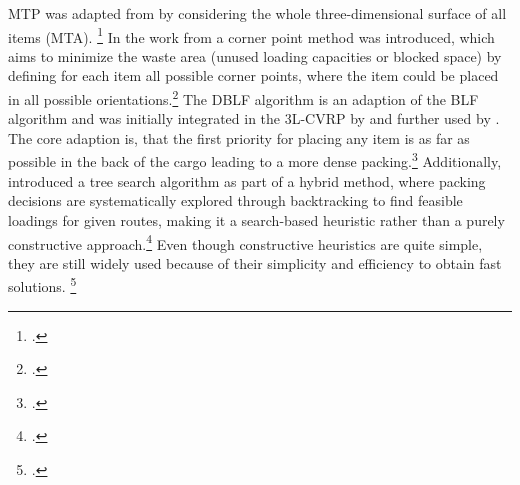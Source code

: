\gls{MTP} was adapted from \cite{tarantilis_hybrid_2009} by considering the whole three-dimensional
surface of all items (\gls{MTA}). \footcite[cf.][pp. 258-260]{tarantilis_hybrid_2009}
In the work from \cite{tao_effective_2015} a corner point method
was introduced, which aims to minimize the waste area (unused loading capacities or blocked space) by
defining for each item all possible corner points, where the item could be placed in all possible
orientations.\footcite[cf.][pp. 130-132]{tao_effective_2015} The \gls{DBLF} algorithm
is an adaption of the \gls{BLF} algorithm and was initially integrated in the \gls{3L-CVRP} by \cite{wang_two_2010}
and further used by \cite{krebs_advanced_2021}.
The core adaption is, that the first priority for placing any item is as far as possible in the back of the cargo
leading to a more dense packing.\footcites(cf.)()[pp. 259-263]{wang_two_2010}[pp. 8-9]{krebs_axle_2021}
Additionally, \cite{bortfeldt_hybrid_2012} introduced a tree search algorithm as part of a hybrid method,
where packing decisions are systematically explored through backtracking to find feasible loadings for
given routes, making it a search-based heuristic rather than a purely constructive approach.\footcite[cf.][p. 2251f]{bortfeldt_hybrid_2012}
Even though constructive heuristics are quite simple, they are still widely used because of their simplicity and efficiency to obtain fast solutions.
\footcite[cf.][pp. 11--13]{tamke_branch-and-cut_2024}

